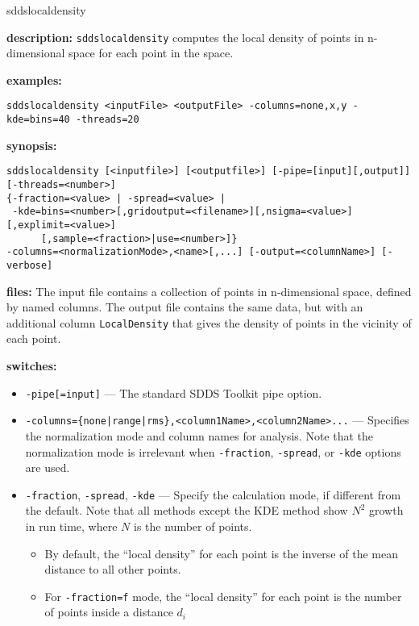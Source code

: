 \begin{sddsprog}{sddslocaldensity}
  \item \textbf{description:}
  \verb|sddslocaldensity| computes the local density of points in n-dimensional space for each point in the space.
  \item \textbf{examples:}
    \begin{verbatim}
sddslocaldensity <inputFile> <outputFile> -columns=none,x,y -kde=bins=40 -threads=20
    \end{verbatim}
  \item \textbf{synopsis:}
    \begin{verbatim}
sddslocaldensity [<inputfile>] [<outputfile>] [-pipe=[input][,output]] [-threads=<number>]
{-fraction=<value> | -spread=<value> |
 -kde=bins=<number>[,gridoutput=<filename>][,nsigma=<value>][,explimit=<value>]
      [,sample=<fraction>|use=<number>]}
-columns=<normalizationMode>,<name>[,...] [-output=<columnName>] [-verbose]
    \end{verbatim}
  \item \textbf{files:}
  The input file contains a collection of points in n-dimensional space, defined by named columns.
  The output file contains the same data, but with an additional column \verb|LocalDensity| that gives
  the density of points in the vicinity of each point.
  \item \textbf{switches:}
    \begin{itemize}
      \item \verb|-pipe[=input]| --- The standard SDDS Toolkit pipe option.
      \item \verb!-columns={none|range|rms},<column1Name>,<column2Name>...! ---
        Specifies the normalization mode and column names for analysis.
        Note that the normalization mode is irrelevant when \verb|-fraction|, \verb|-spread|, or \verb|-kde| options are used.
      \item \verb|-fraction|, \verb|-spread|, \verb|-kde| --- Specify the calculation mode, if different from the default.
        Note that all methods except the KDE method show $N^2$ growth in run time, where $N$ is the number of points.
        \begin{itemize}
          \item By default, the ``local density'' for each point is the inverse of the mean distance to all other points.
          \item For \verb|-fraction=f| mode, the ``local density'' for each point is the number of points inside a distance $d_i$

\end{itemize}
\end{itemize}
\end{sddsprog}
